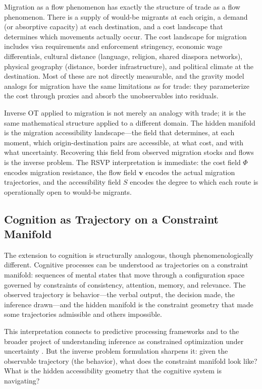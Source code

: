 \documentclass[12pt]{article}
\begin{document}
Migration as a flow phenomenon has exactly the structure of trade as a flow phenomenon. There is a supply of would-be migrants at each origin, a demand (or absorptive capacity) at each destination, and a cost landscape that determines which movements actually occur. The cost landscape for migration includes visa requirements and enforcement stringency, economic wage differentials, cultural distance (language, religion, shared diaspora networks), physical geography (distance, border infrastructure), and political climate at the destination. Most of these are not directly measurable, and the gravity model analogs for migration have the same limitations as for trade: they parameterize the cost through proxies and absorb the unobservables into residuals.

Inverse OT applied to migration is not merely an analogy with trade; it is the same mathematical structure applied to a different domain. The hidden manifold is the migration accessibility landscape---the field that determines, at each moment, which origin-destination pairs are accessible, at what cost, and with what uncertainty. Recovering this field from observed migration stocks and flows is the inverse problem. The RSVP interpretation is immediate: the cost field $\Phi$ encodes migration resistance, the flow field $\mathbf{v}$ encodes the actual migration trajectories, and the accessibility field $S$ encodes the degree to which each route is operationally open to would-be migrants.

\subsection{Cognition as Trajectory on a Constraint Manifold}

The extension to cognition is structurally analogous, though phenomenologically different. Cognitive processes can be understood as trajectories on a constraint manifold: sequences of mental states that move through a configuration space governed by constraints of consistency, attention, memory, and relevance. The observed trajectory is behavior---the verbal output, the decision made, the inference drawn---and the hidden manifold is the constraint geometry that made some trajectories admissible and others impossible.

This interpretation connects to predictive processing frameworks \citep{friston2010} and to the broader project of understanding inference as constrained optimization under uncertainty \citep{jaynes2003, mackay2003}. But the inverse problem formulation sharpens it: given the observable trajectory (the behavior), what does the constraint manifold look like? What is the hidden accessibility geometry that the cognitive system is navigating?
\end{document}
